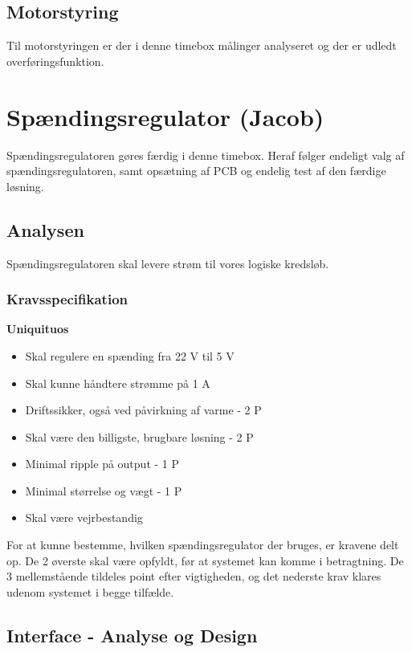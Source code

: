 \subsection{Motorstyring}
\label{sec:motorstyring}
Til motorstyringen er der i denne timebox målinger analyseret og der er udledt overføringsfunktion.
\clearpage
\section{Spændingsregulator (Jacob)}
\label{sec:spandingsregulator-1}

Spændingsregulatoren gøres færdig i denne timebox. Heraf følger endeligt valg af spændingsregulatoren, samt opsætning af PCB og endelig test af den færdige løsning.

\subsection{Analysen}
\label{sec:analysen}

Spændingsregulatoren skal levere strøm til vores logiske kredsløb.

\subsubsection{Kravsspecifikation}
\label{sec:kravsspecifikation}

\textbf{Uniquituos}
\begin{itemize}
\item Skal regulere en spænding fra 22 V til 5 V 
\item Skal kunne håndtere strømme på 1 A 
\item Driftssikker, også ved påvirkning af varme - 2 P
\item Skal være den billigste, brugbare løsning - 2 P
\item Minimal ripple på output - 1 P
\item Minimal størrelse og vægt - 1 P
\item Skal være vejrbestandig 
\end{itemize}

For at kunne bestemme, hvilken spændingsregulator der bruges, er kravene delt op. De 2 øverste skal være opfyldt, før at systemet kan komme i betragtning. De 3 mellemstående tildeles point efter vigtigheden, og det nederste krav klares udenom systemet i begge tilfælde.

\subsection{Interface - Analyse og Design }
\label{sec:interface-analyse-og}

